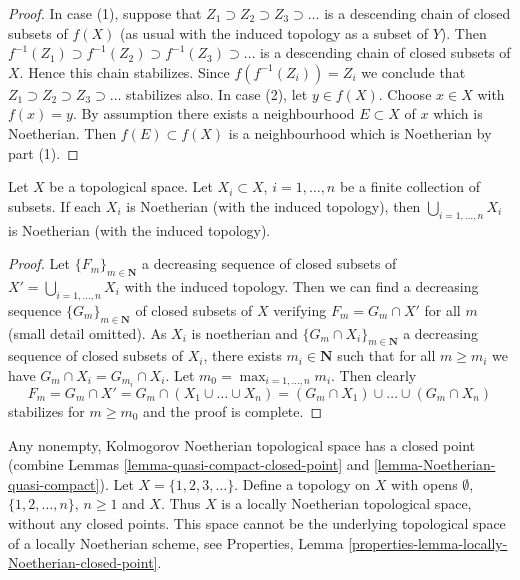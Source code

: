 \begin{proof}
In case (1), suppose that $Z_1 \supset Z_2 \supset Z_3 \supset \ldots$
is a descending chain of closed subsets of $f(X)$ (as usual with the induced
topology as a subset of $Y$). Then
$f^{-1}(Z_1) \supset f^{-1}(Z_2) \supset f^{-1}(Z_3) \supset \ldots$ is
a descending chain of closed subsets of $X$. Hence this chain stabilizes.
Since $f(f^{-1}(Z_i)) = Z_i$ we conclude that
$Z_1 \supset Z_2 \supset Z_3 \supset \ldots$
stabilizes also. In case (2), let $y \in f(X)$. Choose $x \in X$ with
$f(x) = y$. By assumption there exists a neighbourhood $E \subset X$ of
$x$ which is Noetherian. Then $f(E) \subset f(X)$ is a neighbourhood
which is Noetherian by part (1).
\end{proof}

\begin{lemma}
\label{lemma-finite-union-Noetherian}
Let $X$ be a topological space.
Let $X_i \subset X$, $i = 1, \ldots, n$ be a finite collection of subsets.
If each $X_i$ is Noetherian (with the induced topology), then
$\bigcup_{i = 1, \ldots, n}  X_i$ is Noetherian (with the induced topology).
\end{lemma}

\begin{proof}
Let $\{F_m\}_{m \in \mathbf{N}}$ a decreasing sequence of closed subsets
of $X' = \bigcup_{i = 1, \ldots, n}  X_i$ with the induced topology.
Then we can find a decreasing sequence $\{G_m\}_{m \in \mathbf{N}}$
of closed subsets of $X$ verifying $F_m = G_m \cap X'$ for all $m$
(small detail omitted). As $X_i$ is noetherian and
$\{G_m \cap X_i\}_{m \in \mathbf{N}}$ a decreasing sequence
of closed subsets of $X_i$, there exists $m_i \in \mathbf{N}$
such that for all $m \geq m_i$ we have $G_m \cap X_i = G_{m_i} \cap X_i$.
Let $m_0 = \max_{i = 1, \ldots, n} m_i$. Then clearly
$$
F_m = G_m \cap X' = G_m \cap (X_1 \cup \ldots \cup X_n) =
(G_m \cap X_1) \cup \ldots \cup (G_m \cap X_n)
$$
stabilizes for $m \geq m_0$ and the proof is complete.
\end{proof}

\begin{example}
\label{example-locally-Noetherian-no-closed-point}
Any nonempty, Kolmogorov Noetherian topological space has a closed point
(combine Lemmas \ref{lemma-quasi-compact-closed-point} and
\ref{lemma-Noetherian-quasi-compact}).
Let $X = \{1, 2, 3, \ldots \}$. Define a topology on $X$
with opens $\emptyset$, $\{1, 2, \ldots, n\}$, $n \geq 1$
and $X$. Thus $X$ is a locally Noetherian topological space,
without any closed points. This space cannot be the underlying
topological space of a locally Noetherian scheme, see
Properties, Lemma \ref{properties-lemma-locally-Noetherian-closed-point}.
\end{example}

